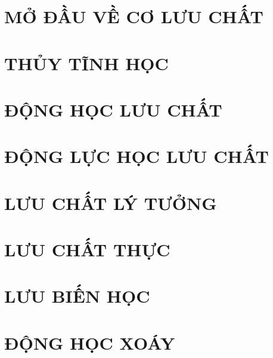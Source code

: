 \documentclass[../main.tex]{subfiles}
\begin{document}
    \chapter{MỞ ĐẦU VỀ CƠ LƯU CHẤT}
    	\minitoc
        \newpage
        
    \chapter{THỦY TĨNH HỌC}
		\minitoc
    \chapter{ĐỘNG HỌC LƯU CHẤT}
		\minitoc
    \chapter{ĐỘNG LỰC HỌC LƯU CHẤT}
		\minitoc
    \chapter{LƯU CHẤT LÝ TƯỞNG}
		\minitoc
    \chapter{LƯU CHẤT THỰC}
		\minitoc
    \chapter{LƯU BIẾN HỌC}
		\minitoc
    \chapter{ĐỘNG HỌC XOÁY}
		\minitoc
\end{document}
